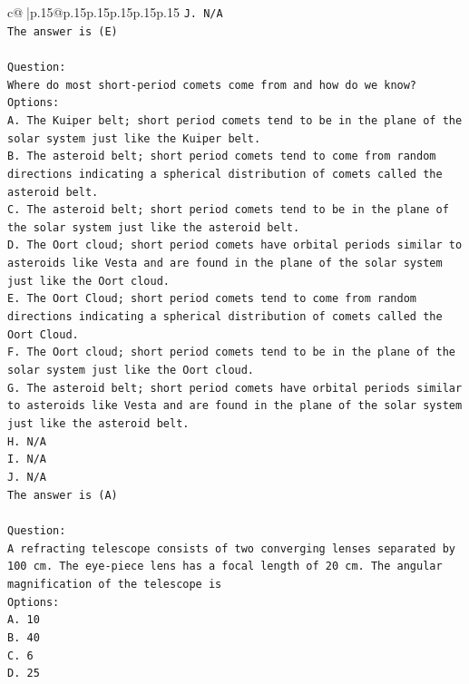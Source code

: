 \documentclass{article}
\begin{document}
{\begin{supertabular}{c@{$\;$}|p{.15\linewidth}@{}p{.15\linewidth}p{.15\linewidth}p{.15\linewidth}p{.15\linewidth}p{.15\linewidth}}
{{{\texttt{J. N/A} \\
\texttt{The answer is (E)} \\
\\ 
\texttt{Question:} \\
\texttt{Where do most short{-}period comets come from and how do we know?} \\
\texttt{Options:} \\
\texttt{A. The Kuiper belt; short period comets tend to be in the plane of the solar system just like the Kuiper belt.} \\
\texttt{B. The asteroid belt; short period comets tend to come from random directions indicating a spherical distribution of comets called the asteroid belt.} \\
\texttt{C. The asteroid belt; short period comets tend to be in the plane of the solar system just like the asteroid belt.} \\
\texttt{D. The Oort cloud; short period comets have orbital periods similar to asteroids like Vesta and are found in the plane of the solar system just like the Oort cloud.} \\
\texttt{E. The Oort Cloud; short period comets tend to come from random directions indicating a spherical distribution of comets called the Oort Cloud.} \\
\texttt{F. The Oort cloud; short period comets tend to be in the plane of the solar system just like the Oort cloud.} \\
\texttt{G. The asteroid belt; short period comets have orbital periods similar to asteroids like Vesta and are found in the plane of the solar system just like the asteroid belt.} \\
\texttt{H. N/A} \\
\texttt{I. N/A} \\
\texttt{J. N/A} \\
\texttt{The answer is (A)} \\
\\ 
\texttt{Question:} \\
\texttt{A refracting telescope consists of two converging lenses separated by 100 cm. The eye{-}piece lens has a focal length of 20 cm. The angular magnification of the telescope is} \\
\texttt{Options:} \\
\texttt{A. 10} \\
\texttt{B. 40} \\
\texttt{C. 6} \\
\texttt{D. 25} \\
}}}
\end{supertabular}}
\end{document}
